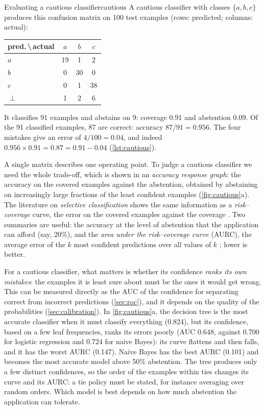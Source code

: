 \begin{example}{Evaluating a cautious classifier}{cautious}
A cautious classifier with classes $\{a,b,c\}$ produces this confusion matrix on 100 test
examples (rows: predicted; columns: actual):
\begin{center}\small
\begin{tabular}{@{}lccc@{}}
\toprule
{\footnotesize pred.\,\textbackslash\,actual} & $a$ & $b$ & $c$\\
\midrule
$a$ & 19 & 1 & 2\\
$b$ & 0 & 30 & 0\\
$c$ & 0 & 1 & 38\\
$\perp$ & 1 & 2 & 6\\
\bottomrule
\end{tabular}
\end{center}
It classifies 91 examples and abstains on 9: coverage 0.91 and abstention 0.09. Of the 91
classified examples, 87 are correct: accuracy $87/91=0.956$. The four mistakes give an error of
$4/100=0.04$, and indeed $0.956\times0.91=0.87=0.91-0.04$ (\cref{lst:cautious}).
\end{example}

A single matrix describes one operating point. To judge a cautious classifier we need the whole
trade-off, which is shown in an \emph{accuracy response graph}: the accuracy on the covered
examples against the abstention, obtained by abstaining on increasingly large fractions of the
least confident examples (\cref{fig:cautious}a). The literature on \emph{selective
classification} shows the same information as a \emph{risk--coverage} curve, the error on the
covered examples against the coverage \citep{elyaniv2010foundations,geifman2017selective}. Two
summaries are useful: the accuracy at the level of abstention that the application can afford
(say, 20\%), and the \emph{area under the risk--coverage curve} (AURC), the average error of the
$k$ most confident predictions over all values of $k$ \citep{geifman2019bias}; lower is better.

For a cautious classifier, what matters is whether its confidence
\emph{ranks its own mistakes}: the examples it is least sure about must be the ones it would get
wrong. This can be measured directly as the AUC of the confidence for separating correct from
incorrect predictions (\cref{sec:roc}), and it depends on the quality of the probabilities
(\cref{sec:calibration}). In \cref{fig:cautious}a, the decision tree is the most accurate
classifier when it must classify everything (0.824), but its confidence, based on a few leaf
frequencies, ranks its errors poorly (AUC 0.648, against 0.700 for logistic regression and 0.724
for naive Bayes): its curve flattens and then falls, and it has the worst AURC (0.147). Naive
Bayes has the best AURC (0.101) and becomes the most accurate model above 50\% abstention. The tree
produces only a few distinct confidences, so the order of the examples within ties changes its curve
and its AURC: a tie policy must be stated, for instance averaging over random orders. Which
model is best depends on how much abstention the application can tolerate.

